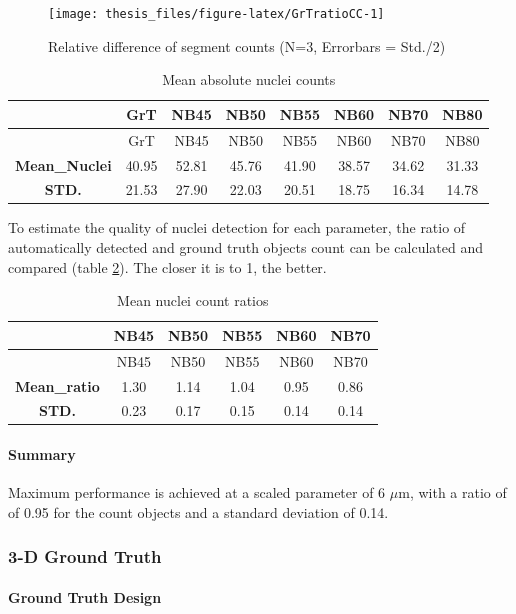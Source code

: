 \documentclass[11pt,singlespacinge,twoside]{reedthesis} %
\begin{document}
\begin{figure}

{\centering \texttt{[image: thesis\_files/figure-latex/GrTratioCC-1]} 

}

\caption[Relative difference of segment counts]{Relative difference of segment counts (N=3, Errorbars = Std./2)}\label{fig:GrTratioCC}
\end{figure}
\begin{longtable}[]{@{}cccccccc@{}}
\caption{\label{tab:meanabsnuc} Mean absolute nuclei counts}\tabularnewline
\toprule
~ & GrT & NB45 & NB50 & NB55 & NB60 & NB70 & NB80\tabularnewline
\midrule
\endfirsthead
\toprule
~ & GrT & NB45 & NB50 & NB55 & NB60 & NB70 & NB80\tabularnewline
\midrule
\endhead
\textbf{Mean\_Nuclei} & 40.95 & 52.81 & 45.76 & 41.90 & 38.57 & 34.62 & 31.33\tabularnewline
\textbf{STD.} & 21.53 & 27.90 & 22.03 & 20.51 & 18.75 & 16.34 & 14.78\tabularnewline
\bottomrule
\end{longtable}
\noindent To estimate the quality of nuclei detection for each parameter, the ratio of automatically detected and ground truth objects count can be calculated and compared (table \ref{tab:nrcount}). The closer it is to 1, the better.
\begin{longtable}[]{@{}cccccc@{}}
\caption{\label{tab:nrcount} Mean nuclei count ratios}\tabularnewline
\toprule
~ & NB45 & NB50 & NB55 & NB60 & NB70\tabularnewline
\midrule
\endfirsthead
\toprule
~ & NB45 & NB50 & NB55 & NB60 & NB70\tabularnewline
\midrule
\endhead
\textbf{Mean\_ratio} & 1.30 & 1.14 & 1.04 & 0.95 & 0.86\tabularnewline
\textbf{STD.} & 0.23 & 0.17 & 0.15 & 0.14 & 0.14\tabularnewline
\bottomrule
\end{longtable}
\hypertarget{summary-1}{%
\paragraph{Summary}\label{summary-1}}

Maximum performance is achieved at a scaled parameter of 6 \(\mu\)m, with a ratio of of 0.95 for the count objects and a standard deviation of 0.14.

\hypertarget{d-ground-truth-1}{%
\subsubsection{3-D Ground Truth}\label{d-ground-truth-1}}

\hypertarget{ground-truth-design-1}{%
\paragraph{Ground Truth Design}\label{ground-truth-design-1}}
\end{document}
